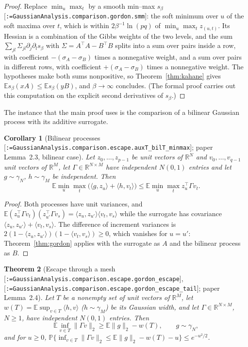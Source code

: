 \documentclass[11pt]{article}
\makeatletter
\newcommand{\formal@break}[1]{\@tfor\formal@tok:=#1\do{%
  \formal@tok
  \expandafter\ifx\formal@tok.\allowbreak\else
  \expandafter\ifx\formal@tok\_\allowbreak\fi\fi}}
\DeclareRobustCommand{\formal}[1]{\textnormal{[\texttt{\small\formal@break{#1}}]}}
\newcommand{\R}{\mathbb{R}}
\newcommand{\E}{\mathbb{E}}
\newcommand{\Prob}{\mathbb{P}}
\newcommand{\ip}[2]{\langle #1, #2\rangle}
\newcommand{\norm}[1]{\lVert #1\rVert}
\newcommand{\gauss}{\gamma}
\theoremstyle{plain}
\newtheorem{theorem}{Theorem}[section]
\newtheorem{corollary}[theorem]{Corollary}
\theoremstyle{definition}
\makeatother
\begin{document}
\begin{proof}
Replace $\min_u \max_t$ by a smooth min--max $s_\beta$
\formal{GaussianAnalysis.comparison.gordon.smm}: the soft minimum over $u$
of the soft maxima over $t$, which is within $2\beta^{-1}\ln(pq)$ of
$\min_u\max_t z_{(u,t)}$. Its Hessian is a combination of the Gibbs weights
of the two levels, and the sum $\sum_{jl} \Sigma_{jl}\partial_j\partial_l s_\beta$
with $\Sigma = A^{\top}A - B^{\top}B$ splits into a sum over pairs inside a
row, with coefficient $-(\sigma_A - \sigma_B)$ times a nonnegative weight,
and a sum over pairs in different rows, with coefficient $+(\sigma_A - \sigma_B)$
times a nonnegative weight. The hypotheses make both sums nonpositive, so
Theorem~\ref{thm:kahane} gives $\E s_\beta(xA) \le \E s_\beta(yB)$, and
$\beta \to \infty$ concludes. (The formal proof carries out this computation
on the explicit second derivatives of $s_\beta$.)
\end{proof}

The instance that the main proof uses is the comparison of a bilinear
Gaussian process with its additive surrogate.

\begin{corollary}[Bilinear processes \formal{GaussianAnalysis.comparison.escape.auxT\_bilT\_minmax}; paper Lemma~2.3, bilinear case]\label{cor:bil}
Let $z_0, \dots, z_{p-1}$ be unit vectors of $\R^N$ and $v_0, \dots, v_{q-1}$ unit
vectors of $\R^M$, let $\Gamma \in \R^{N \times M}$ have independent
$N(0,1)$ entries and let $g \sim \gauss_N$, $h \sim \gauss_M$ be
independent. Then
\[
\E \min_u \max_t \bigl(\ip{g}{z_u} + \ip{h}{v_t}\bigr) \le \E \min_u \max_t z_u^{\top} \Gamma v_t .
\]
\end{corollary}

\begin{proof}
Both processes have unit variances, and
$\E(z_u^{\top}\Gamma v_t)(z_{u'}^{\top}\Gamma v_s) = \ip{z_u}{z_{u'}} \ip{v_t}{v_s}$
while the surrogate has covariance $\ip{z_u}{z_{u'}} + \ip{v_t}{v_s}$. The
difference of increment variances is $2(1 - \ip{z_u}{z_{u'}})(1 - \ip{v_t}{v_s}) \ge 0$,
which vanishes for $u = u'$: Theorem~\ref{thm:gordon} applies with the
surrogate as $A$ and the bilinear process as $B$.
\end{proof}

\begin{theorem}[Escape through a mesh \formal{GaussianAnalysis.comparison.escape.gordon\_escape}, \formal{GaussianAnalysis.comparison.escape.gordon\_escape\_tail}; paper Lemma~2.4]\label{thm:escape}
Let $T$ be a nonempty set of unit vectors of $\R^M$, let
$w(T) = \E \sup_{v \in T} \ip{h}{v}$ ($h \sim \gauss_M$) be its Gaussian
width, and let $\Gamma \in \R^{N\times M}$, $N \ge 1$, have independent
$N(0,1)$ entries. Then
\[
\E \inf_{v \in T} \norm{\Gamma v}_2 \ge \E\norm{g}_2 - w(T), \qquad g \sim \gauss_N,
\]
and for $u \ge 0$,
$\Prob\{\inf_{v\in T} \norm{\Gamma v}_2 \le \E\norm{g}_2 - w(T) - u\} \le e^{-u^2/2}$.
\end{theorem}
\end{document}

